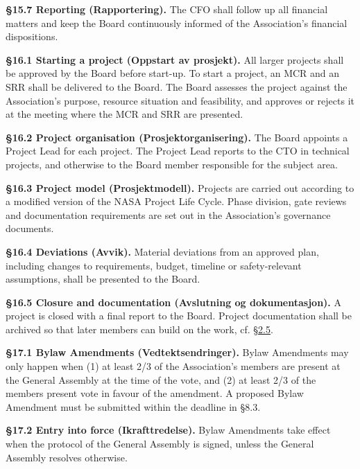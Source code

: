 \documentclass{../../../Common/Latex/Templates/rapport}
\begin{document}
\textbf{\S 15.7 Reporting (Rapportering).}\label{bylaw:15.7} The CFO shall follow up all financial matters and keep the Board continuously informed of the Association's financial dispositions.

\label{bylaw:16}
\textbf{\S 16.1 Starting a project (Oppstart av prosjekt).}\label{bylaw:16.1} All larger projects shall be approved by the Board before start-up. To start a project, an MCR and an SRR shall be delivered to the Board. The Board assesses the project against the Association's purpose, resource situation and feasibility, and approves or rejects it at the meeting where the MCR and SRR are presented.

\textbf{\S 16.2 Project organisation (Prosjektorganisering).}\label{bylaw:16.2} The Board appoints a Project Lead for each project. The Project Lead reports to the CTO in technical projects, and otherwise to the Board member responsible for the subject area.

\textbf{\S 16.3 Project model (Prosjektmodell).}\label{bylaw:16.3} Projects are carried out according to a modified version of the NASA Project Life Cycle. Phase division, gate reviews and documentation requirements are set out in the Association's governance documents.

\textbf{\S 16.4 Deviations (Avvik).}\label{bylaw:16.4} Material deviations from an approved plan, including changes to requirements, budget, timeline or safety-relevant assumptions, shall be presented to the Board.

\textbf{\S 16.5 Closure and documentation (Avslutning og dokumentasjon).}\label{bylaw:16.5} A project is closed with a final report to the Board. Project documentation shall be archived so that later members can build on the work, cf. \hyperref[bylaw:2.5]{\S 2.5}.


\label{bylaw:17}
\textbf{\S 17.1 Bylaw Amendments (Vedtektsendringer).}\label{bylaw:17.1} Bylaw Amendments may only happen when (1) at least 2/3 of the Association's members are present at the General Assembly at the time of the vote, and (2) at least 2/3 of the members present vote in favour of the amendment. A proposed Bylaw Amendment must be submitted within the deadline in \S8.3.

\textbf{\S 17.2 Entry into force (Ikrafttredelse).}\label{bylaw:17.2} Bylaw Amendments take effect when the protocol of the General Assembly is signed, unless the General Assembly resolves otherwise.
\end{document}

